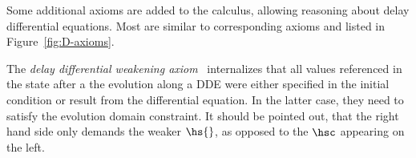         Some additional axioms are added to the calculus, allowing reasoning about delay differential equations. Most are similar to corresponding \dL axioms and listed in Figure~\ref{fig:D-axioms}.

        The \emph{delay differential weakening axiom}~ internalizes that all values referenced in the state after a the evolution along a DDE were either specified in the initial condition or result from the differential equation. In the latter case, they need to satisfy the evolution domain constraint.
        It should be pointed out, that the right hand side only demands the weaker $\hs{}$, as opposed to the $\hsc$ appearing on the left.

        \begin{figure}[h]
            \begin{calculuscollections}{\coloumnwidth}
            \begin{calculus}


\end{calculus}
\end{calculuscollections}
\end{figure}

